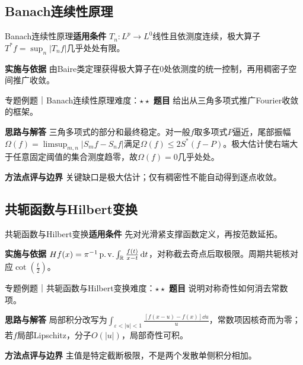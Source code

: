 \subsection{Banach连续性原理}\label{mat:fourier_advanced:banach}
\begin{method}{Banach连续性原理}\textbf{适用条件} $T_n:L^p\to L^0$线性且依测度连续，极大算子$T^*f=\sup_n|T_nf|$几乎处处有限。\par\textbf{实施与依据} 由Baire类定理获得极大算子在0处依测度的统一控制，再用稠密子空间推广收敛。\end{method}
\begin{example}{专题例题｜Banach连续性原理}{难度：$\star\star$}
\textbf{题目} 给出从三角多项式推广Fourier收敛的框架。\par\textbf{思路与解答} 三角多项式的部分和最终稳定。对一般$f$取多项式$P$逼近，尾部振幅$\Omega(f)=\limsup_{m,n}|S_mf-S_nf|$满足$\Omega(f)\le2S^*(f-P)$。极大估计使右端大于任意固定阈值的集合测度趋零，故$\Omega(f)=0$几乎处处。\par\textbf{方法点评与边界} 关键缺口是极大估计；仅有稠密性不能自动得到逐点收敛。
\end{example}
\subsection{共轭函数与Hilbert变换}\label{mat:fourier_advanced:hilbert}
\begin{method}{共轭函数与Hilbert变换}\textbf{适用条件} 先对光滑紧支撑函数定义，再按范数延拓。\par\textbf{实施与依据} $Hf(x)=\pi^{-1}\operatorname{p.v.}\int_{\mathbb{R}} \frac{f(t)}{x-t}\mathop{}\!\mathrm{d} t$，对称截去奇点后取极限。周期共轭核对应$\cot(\frac{t}{2})$。\end{method}
\begin{example}{专题例题｜共轭函数与Hilbert变换}{难度：$\star\star$}
\textbf{题目} 说明对称奇性如何消去常数项。\par\textbf{思路与解答} 局部积分改写为$\int_{\varepsilon<|u|<1}\frac{[f(x-u)-f(x)]\dd u}{u}$，常数项因核奇而为零；若$f$局部Lipschitz，分子$O(|u|)$，局部奇性可积。\par\textbf{方法点评与边界} 主值是特定截断极限，不是两个发散单侧积分相加。
\end{example}
